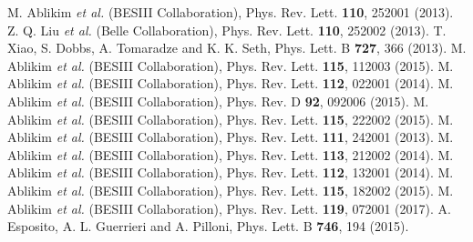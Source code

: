 \documentclass{jps-cp}
\begin{document}
\begin{thebibliography}{9}
 M. Ablikim {\em et al.} (BESIII Collaboration), Phys. Rev. Lett. \textbf{110}, 252001 (2013).
 Z. Q. Liu {\em et al.} (Belle Collaboration), Phys. Rev. Lett. \textbf{110}, 252002 (2013).
 T. Xiao, S. Dobbs, A. Tomaradze and K. K. Seth, Phys. Lett. B \textbf{727}, 366 (2013).
 M. Ablikim {\em et al.} (BESIII Collaboration), Phys. Rev. Lett. \textbf{115}, 112003 (2015).
 M. Ablikim {\em et al.} (BESIII Collaboration), Phys. Rev. Lett. \textbf{112}, 022001 (2014).
 M. Ablikim {\em et al.} (BESIII Collaboration), Phys. Rev. D \textbf{92}, 092006 (2015).
 M. Ablikim {\em et al.} (BESIII Collaboration), Phys. Rev. Lett. \textbf{115}, 222002 (2015).
 M. Ablikim {\em et al.} (BESIII Collaboration), Phys. Rev. Lett. \textbf{111}, 242001 (2013).
 M. Ablikim {\em et al.} (BESIII Collaboration), Phys. Rev. Lett. \textbf{113}, 212002 (2014).
 M. Ablikim {\em et al.} (BESIII Collaboration), Phys. Rev. Lett. \textbf{112}, 132001 (2014).
 M. Ablikim {\em et al.} (BESIII Collaboration), Phys. Rev. Lett. \textbf{115}, 182002 (2015).
 M. Ablikim {\em et al.} (BESIII Collaboration), Phys. Rev. Lett. \textbf{119}, 072001 (2017).
 A. Esposito, A. L. Guerrieri and A. Pilloni, Phys. Lett. B \textbf{746}, 194 (2015).
\end{thebibliography}
\end{document}
